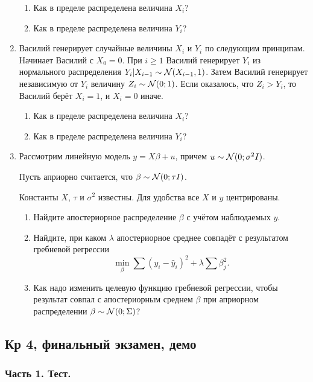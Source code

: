 \documentclass[12pt, a4paper]{article}
\begin{document}
\begin{enumerate}
\begin{enumerate}
\item Как в пределе распределена величина $X_i$?
\item Как в пределе распределена величина $Y_i$?
\end{enumerate}


\item Василий генерирует случайные величины $X_i$ и $Y_i$ по следующим принципам. Начинает Василий с $X_0=0$. При $i\geq 1$ Василий генерирует $Y_i$ из нормального распределения $Y_i|X_{i-1}\sim \mathcal{N}(X_{i-1}, 1)$. Затем Василий генерирует независимую от $Y_i$ величину $Z_i \sim \mathcal{N}(0; 1)$. Если оказалось, что $Z_i>Y_i$, то Василий берёт $X_i=1$, и $X_i=0$ иначе.

\begin{enumerate}
\item Как в пределе распределена величина $X_i$?
\item Как в пределе распределена величина $Y_i$?
\end{enumerate}

\item Рассмотрим линейную модель $y=X\beta+u$, причем $u\sim \mathcal{N}(0;\sigma^2 I)$.

Пусть априорно считается, что $\beta \sim \mathcal{N}(0; \tau I)$.

Константы $X$, $\tau$ и $\sigma^2$ известны. Для удобства все $X$ и $y$ центрированы.

\begin{enumerate}
\item Найдите апостериорное распределение $\beta$ с учётом наблюдаемых $y$.
\item Найдите, при каком $\lambda$ апостериорное среднее совпадёт с результатом гребневой регрессии
\[
\min_{\beta} \sum (y_i - \hat y_i)^2 + \lambda \sum \beta_j^2.
\]
\item Как надо изменить целевую функцию гребневой регрессии, чтобы результат совпал с апостериорным среднем $\beta$ при априорном распределении $\beta \sim \mathcal{N}(0; \Sigma)$?
\end{enumerate}

\end{enumerate}




\subsection{Кр 4, финальный экзамен, демо}


\subsubsection*{Часть 1. Тест.}
\end{document}

